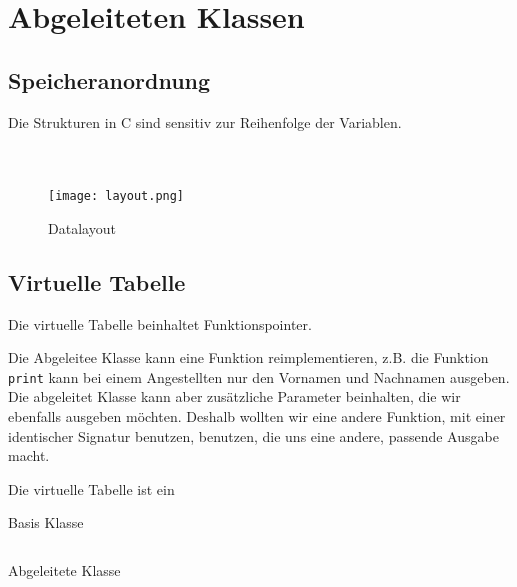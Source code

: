 \section{Abgeleiteten Klassen}
\subsection{Speicheranordnung}
Die Strukturen in C sind sensitiv zur Reihenfolge der Variablen.



\inputminted{c}{code/structlayout/base.c}
\inputminted{c}{code/structlayout/derived.c}
\inputminted{c}{code/structlayout/cast.c}


\begin{figure}[h]
	\centering
	\texttt{[image: layout.png]}
	\caption{Datalayout}
	\label{fig:datalayout}
\end{figure}


\subsection{Virtuelle Tabelle}
Die virtuelle Tabelle beinhaltet Funktionspointer.

Die Abgeleitee Klasse kann eine Funktion reimplementieren, z.B. die Funktion \texttt{print} kann bei einem Angestellten nur den Vornamen und Nachnamen ausgeben.
Die abgeleitet Klasse kann aber zusätzliche Parameter beinhalten, die wir ebenfalls ausgeben möchten.
Deshalb wollten wir eine andere Funktion, mit einer identischer Signatur benutzen, benutzen, die uns eine andere, passende Ausgabe macht.


Die virtuelle Tabelle ist ein


\begin{code}
	\caption{Basis Klasse}
	\label{code:vtbl:base}
	\inputminted{cpp}{code/virt_table/employee.c}
\end{code}


\begin{code}
	\caption{Abgeleitete Klasse}
	\label{code:vtbl:derived}
	\inputminted{cpp}{code/virt_table/manager.c}
\end{code}




